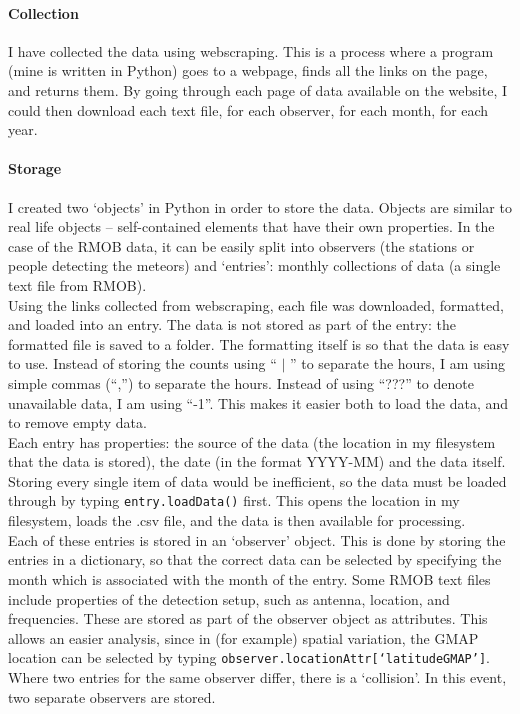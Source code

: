 \paragraph{Collection\\}
I have collected the data using webscraping. This is a process where a program (mine is written in Python) goes to a webpage, finds all the links on the page, and returns them. By going through each page of data available on the website, I could then download each text file, for each observer, for each month, for each year.\\
\paragraph{Storage\\}
I created two `objects' in Python in order to store the data. Objects are similar to real life objects -- self-contained elements that have their own properties. In the case of the RMOB data, it can be easily split into observers (the stations or people detecting the meteors) and `entries': monthly collections of data (a single text file from RMOB).\\
Using the links collected from webscraping, each file was downloaded, formatted,  and loaded into an entry. The data is not stored as part of the entry: the formatted file is saved to a folder. The formatting itself is so that the data is easy to use. Instead of storing the counts using `` $|$ '' to separate the hours, I am using simple commas (``,'') to separate the hours. Instead of using ``???'' to denote unavailable data, I am using ``-1''. This makes it easier both to load the data, and to remove empty data.\\
Each entry has properties: the source of the data (the location in my filesystem that the data is stored), the date (in the format YYYY-MM) and the data itself. Storing every single item of data would be inefficient, so the data must be loaded through by typing \texttt{entry.loadData()} first. This opens the location in my filesystem, loads the .csv file, and the data is then available for processing. \\
Each of these entries is stored in an `observer' object. This is done by storing the entries in a dictionary, so that the correct data can be selected by specifying the month which is associated with the month of the entry. Some RMOB text files include properties of the detection setup, such as antenna, location, and frequencies. These are stored as part of the observer object as attributes. This allows an easier analysis, since in (for example) spatial variation, the GMAP location can be selected by typing \texttt{observer.locationAttr[`latitudeGMAP']}. Where two entries for the same observer differ, there is a `collision'. In this event, two separate observers are stored.
